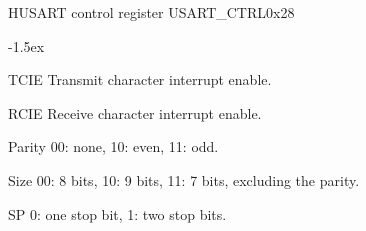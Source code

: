 \documentclass[12pt]{article}
\begin{document}
\begin{register}{H}{USART control register USART\_CTRL}{0x28}
\label{usartctrl}
%
%
%
%
%
%
\regnewline%
\end{register}
\begin{regdesc}[0.6\textwidth]\begin{reglist}[00000]
\itemsep-1.5ex
\item[TCIE] Transmit character interrupt enable.
\item[RCIE] Receive character interrupt enable.
\item[Parity] 00: none, 10: even, 11: odd.
\item[Size] 00: 8 bits, 10: 9 bits, 11: 7 bits, excluding the parity.
\item[SP] 0: one stop bit, 1: two stop bits.
\end{reglist}\end{regdesc}
\end{document}
